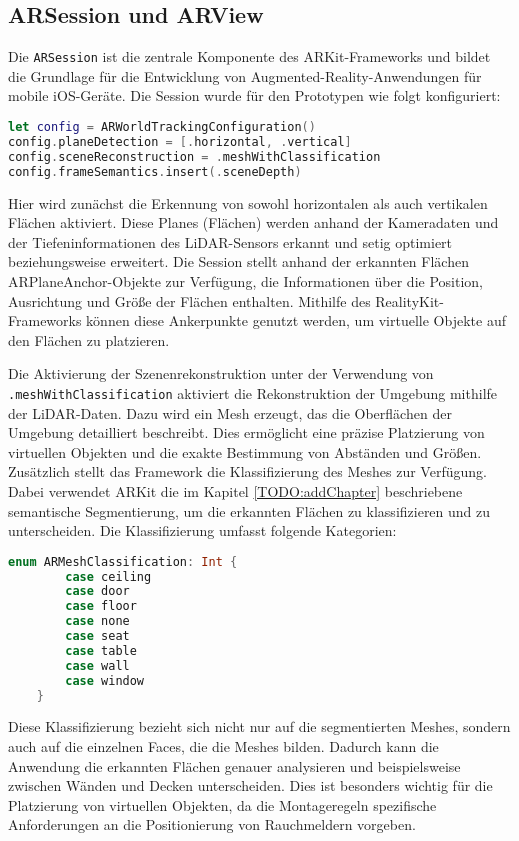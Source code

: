 \subsection{ARSession und ARView}

Die \texttt{ARSession} ist die zentrale Komponente des ARKit-Frameworks und bildet die Grundlage für die Entwicklung von Augmented-Reality-Anwendungen für mobile iOS-Geräte. Die Session wurde für den Prototypen wie folgt konfiguriert:

\begin{lstlisting}[language=Swift]
let config = ARWorldTrackingConfiguration()
config.planeDetection = [.horizontal, .vertical]
config.sceneReconstruction = .meshWithClassification
config.frameSemantics.insert(.sceneDepth)
\end{lstlisting}

Hier wird zunächst die Erkennung von sowohl horizontalen als auch vertikalen Flächen aktiviert. Diese Planes (Flächen) werden anhand der Kameradaten und der Tiefeninformationen des LiDAR-Sensors erkannt und setig optimiert beziehungsweise erweitert. Die Session stellt anhand der erkannten Flächen ARPlaneAnchor-Objekte zur Verfügung, die Informationen über die Position, Ausrichtung und Größe der Flächen enthalten. Mithilfe des RealityKit-Frameworks können diese Ankerpunkte genutzt werden, um virtuelle Objekte auf den Flächen zu platzieren.

Die Aktivierung der Szenenrekonstruktion unter der Verwendung von \texttt{.meshWithClassification} aktiviert die Rekonstruktion der Umgebung mithilfe der LiDAR-Daten. Dazu wird ein Mesh erzeugt, das die Oberflächen der Umgebung detailliert beschreibt. Dies ermöglicht eine präzise Platzierung von virtuellen Objekten und die exakte Bestimmung von Abständen und Größen. Zusätzlich stellt das Framework die Klassifizierung des Meshes zur Verfügung. Dabei verwendet ARKit die im Kapitel \ref{TODO:addChapter} beschriebene semantische Segmentierung, um die erkannten Flächen zu klassifizieren und zu unterscheiden. Die Klassifizierung umfasst folgende Kategorien:

\begin{lstlisting}[language=Swift]
    enum ARMeshClassification: Int {
        case ceiling
        case door
        case floor
        case none
        case seat
        case table  
        case wall
        case window
    }
\end{lstlisting}

Diese Klassifizierung bezieht sich nicht nur auf die segmentierten Meshes, sondern auch auf die einzelnen Faces, die die Meshes bilden. Dadurch kann die Anwendung die erkannten Flächen genauer analysieren und beispielsweise zwischen Wänden und Decken unterscheiden. Dies ist besonders wichtig für die Platzierung von virtuellen Objekten, da die Montageregeln spezifische Anforderungen an die Positionierung von Rauchmeldern vorgeben.

